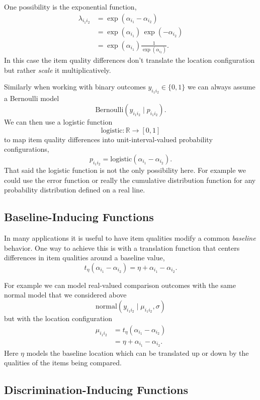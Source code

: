 \documentclass[
  letterpaper,
  DIV=11,
  numbers=noendperiod]{scrartcl}
\begin{document}
One possibility is the exponential function, \begin{align*}
\lambda_{i_{1} i_{2}}
&=
\exp(\alpha_{i_{1}} - \alpha_{i_{2}})
\\
&=
\exp(\alpha_{i_{1}}) \, \exp(-\alpha_{i_{2}})
\\
&=
\exp(\alpha_{i_{1}}) \frac{1}{\exp(\alpha_{i_{2}})}.
\end{align*} In this case the item quality differences don't translate
the location configuration but rather \emph{scale} it multiplicatively.

Similarly when working with binary outcomes
\(y_{i_{1} i_{2}} \in \{0, 1\}\) we can always assume a Bernoulli model
\[
\text{Bernoulli}(y_{i_{1} i_{2}} \mid p_{i_{1} i_{2}}).
\] We can then use a logistic function \[
\mathrm{logistic} : \mathbb{R} \rightarrow [0, 1]
\] to map item quality differences into unit-interval-valued probability
configurations, \[
p_{i_{1} i_{2}} = \mathrm{logistic}(\alpha_{i_{1}} - \alpha_{i_{2}}).
\] That said the logistic function is not the only possibility here. For
example we could use the error function or really the cumulative
distribution function for any probability distribution defined on a real
line.

\subsection{Baseline-Inducing
Functions}\label{baseline-inducing-functions}

In many applications it is useful to have item qualities modify a common
\emph{baseline} behavior. One way to achieve this is with a translation
function that centers differences in item qualities around a baseline
value, \[
t_{\eta}(\alpha_{i_{1}} - \alpha_{i_{2}})
=
\eta + \alpha_{i_{1}} - \alpha_{i_{2}}.
\]

For example we can model real-valued comparison outcomes with the same
normal model that we considered above \[
\text{normal}(y_{i_{1} i_{2}} \mid \mu_{i_{1} i_{2}}, \sigma)
\] but with the location configuration \begin{align*}
\mu_{i_{1} i_{2}}
&=
t_{\eta}(\alpha_{i_{1}} - \alpha_{i_{2}})
\\
&=
\eta + \alpha_{i_{1}} - \alpha_{i_{2}}.
\end{align*} Here \(\eta\) models the baseline location which can be
translated up or down by the qualities of the items being compared.

\subsection{Discrimination-Inducing
Functions}\label{discrimination-inducing-functions}
\end{document}
